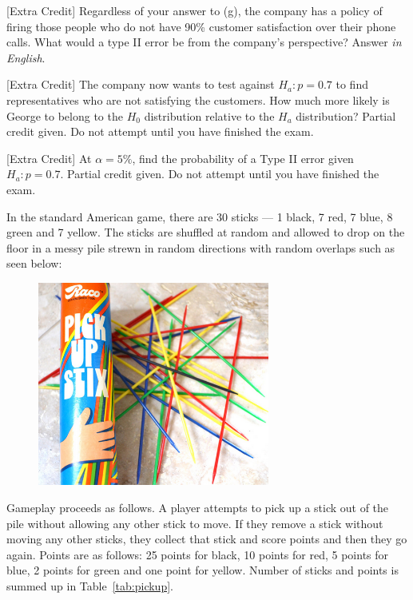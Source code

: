 \documentclass[12pt]{article}
\begin{document}
 [Extra Credit] Regardless of your answer to (g), the company has a policy of firing those people who do not have 90\% customer satisfaction over their phone calls. What would a type II error be from the company's perspective? Answer \textit{in English}. 

 [Extra Credit] The company now wants to test against $H_a : p = 0.7$ to find representatives who are not satisfying the customers. How much more likely is George to belong to the $H_0$ distribution relative to the $H_a$ distribution? Partial credit given. Do not attempt until you have finished the exam.  

 [Extra Credit] At $\alpha=5\%$, find the probability of a Type II error given $H_a : p = 0.7$. Partial credit given. Do not attempt until you have finished the exam. 

\eenum


\problem In the standard American  game, there are 30 sticks --- 1 black, 7 red, 7 blue, 8 green and 7 yellow. The sticks are shuffled at random and allowed to drop on the floor in a messy pile strewn in random directions with random overlaps such as seen below:

\begin{figure}[h]
\begin{center}
\includegraphics[width=3in]{pickup.png}
\end{center}
\end{figure}

Gameplay proceeds as follows. A player attempts to pick up a stick out of the pile without allowing any other stick to move. If they remove a stick without moving any other sticks, they collect that stick and score points and then they go again. Points are as follows: 25 points for black, 10 points for red, 5 points for blue, 2 points for green and one point for yellow. Number of sticks and points is summed up in Table~\ref{tab:pickup}.
\end{document}

